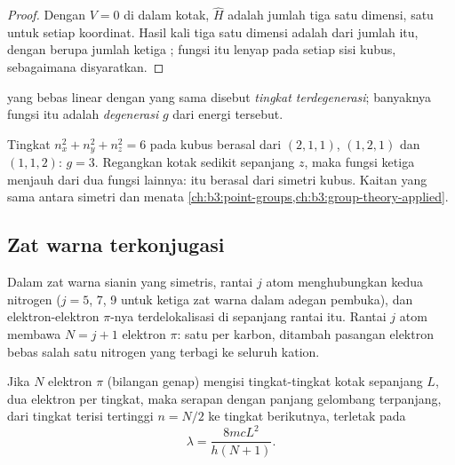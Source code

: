 \begin{proof}
Dengan $V = 0$ di dalam kotak, $\hat H$ adalah jumlah tiga  satu
dimensi, satu untuk setiap koordinat. Hasil kali tiga  satu
dimensi adalah  dari jumlah itu, dengan  berupa
jumlah ketiga ; fungsi itu lenyap pada setiap sisi kubus,
sebagaimana disyaratkan.
\end{proof}

\begin{definition}\label{def:b3:quantum-model-systems:degenerate}
 yang bebas linear dengan  yang sama disebut
\emph{tingkat terdegenerasi}; banyaknya fungsi
itu adalah \emph{degenerasi} $g$ dari energi tersebut.
\end{definition}

\begin{example}\label{ex:b3:quantum-model-systems:cube}
Tingkat $n_x^2 + n_y^2 + n_z^2 = 6$ pada kubus berasal dari $(2,1,1)$,
$(1,2,1)$ dan $(1,1,2)$: $g = 3$. Regangkan kotak sedikit sepanjang $z$, maka
fungsi ketiga menjauh dari dua fungsi lainnya:  itu berasal dari
simetri kubus. Kaitan yang sama antara simetri dan  menata
\cref{ch:b3:point-groups,ch:b3:group-theory-applied}.
\end{example}

\subsection*{Zat warna terkonjugasi}

Dalam zat warna sianin yang simetris, rantai $j$ atom menghubungkan kedua
nitrogen (\(j = 5\), 7, 9 untuk ketiga zat warna dalam adegan pembuka), dan
elektron-elektron $\pi$-nya terdelokalisasi di sepanjang rantai itu. Rantai
$j$ atom membawa $N = j + 1$ elektron $\pi$: satu per karbon, ditambah
pasangan elektron bebas salah satu nitrogen yang terbagi ke seluruh kation.

\begin{proposition}\label{prop:b3:quantum-model-systems:free-electron}
Jika $N$ elektron $\pi$ (bilangan genap) mengisi tingkat-tingkat kotak
sepanjang $L$, dua elektron per tingkat, maka serapan dengan panjang
gelombang terpanjang, dari tingkat terisi tertinggi $n = N/2$ ke tingkat
berikutnya, terletak pada
\[
\lambda = \frac{8mcL^2}{h(N+1)}.
\]
\end{proposition}

